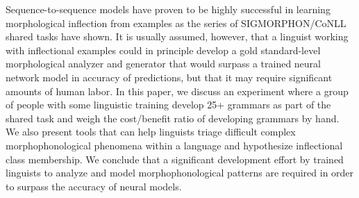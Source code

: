 Sequence-to-sequence models have proven to be highly successful in learning morphological inflection from examples as the series of SIGMORPHON/CoNLL shared tasks have shown. It is usually assumed, however, that a linguist working with inflectional examples could in principle develop a gold standard-level morphological analyzer and generator that would surpass a trained neural network model in accuracy of predictions, but that it may require significant amounts of human labor.  In this paper, we discuss an experiment where a group of people with some linguistic training develop 25+ grammars as part of the shared task and weigh the cost/benefit ratio of developing grammars by hand. We also present tools that can help linguists triage difficult complex morphophonological phenomena within a language and hypothesize inflectional class membership. We conclude that a significant development effort by trained linguists to analyze and model morphophonological patterns are required in order to surpass the accuracy of neural models.
